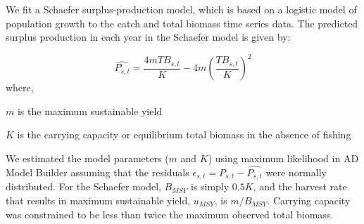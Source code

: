 \documentclass[letterpaper,12pt]{article}
\begin{document}
We fit a Schaefer surplus-production model, which is based on a logistic model of population
growth to the catch and total biomass time series data. The predicted surplus production in each
year in the Schaefer model is given by:

\begin{equation}
\hat{P_{s,t}} = \frac{4mTB_{s,t}}{K} - 4m\left(\frac{TB_{s,t}}{K} \right)^{2}
\end{equation}
where,
\begin{description}
\item $m$ is the maximum sustainable yield 
\item $K$ is the carrying capacity or equilibrium total biomass in the absence of fishing
\end{description}


We estimated the model parameters ($m$ and $K$) using maximum
likelihood in AD Model Builder \citep{admb} assuming that the
residuals $\epsilon_{s,t}=P_{s,t} - \hat{P_{s,t}}$ were normally
distributed.  For the Schaefer model, $B_{MSY}$ is simply $0.5K$, and the
harvest rate that results in maximum sustainable yield, $u_{MSY}$, is
$m/B_{MSY}$. Carrying capacity was constrained to be less than twice the
maximum observed total biomass.








\end{document}
